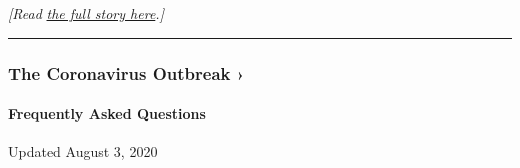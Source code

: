 \emph{{[}Read}
\href{https://www.nytimes3xbfgragh.onion/2020/08/01/us/coronavirus-midwest-cases-deaths.html}{\emph{the
full story here}}\emph{.{]}}

\begin{center}\rule{0.5\linewidth}{\linethickness}\end{center}

\href{https://www.nytimes3xbfgragh.onion/news-event/coronavirus?action=click\&pgtype=Article\&state=default\&region=MAIN_CONTENT_3\&context=storylines_faq}{}

\hypertarget{the-coronavirus-outbreak-}{%
\subsubsection{The Coronavirus Outbreak
›}\label{the-coronavirus-outbreak-}}

\hypertarget{frequently-asked-questions}{%
\paragraph{Frequently Asked
Questions}\label{frequently-asked-questions}}

Updated August 3, 2020

